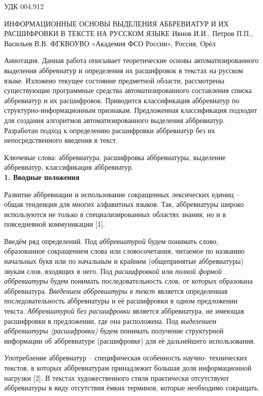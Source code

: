 \documentclass{article}
\begin{document}
УДК 004.912
\begin{center}
ИНФОРМАЦИОННЫЕ ОСНОВЫ ВЫДЕЛЕНИЯ АББРЕВИАТУР И
ИХ РАСШИФРОВКИ В ТЕКСТЕ НА РУССКОМ ЯЗЫКЕ
Ивнов И.И., Петров П.П., Васильев В.В.
ФГКВОУВО «Академия ФСО России»,
Россия, Орёл
\end{center}

Аннотация. Данная работа описывает теоретические основы
автоматизированного выделения аббревиатур и определения их
расшифровок в текстах на русском языке. Изложено текущее
состояние предметной области, рассмотрены существующие
программные средства автоматизированного составления списка
аббревиатур и их расшифровок. Приводится классификация
аббревиатур по структурно-информационным признакам.
Предложенная классификация подходит для создания алгоритмов
автоматизированного выделения аббревиатур. Разработан подход к
определению расшифровки аббревиатур без их непосредственного
введения в текст.

Ключевые слова: аббревиатура, расшифровка аббревиатуры,
выделение аббревиатур, классификация аббревиатур.
\\

\textbf{1. Вводные положения}

Развитие аббревиации и использование сокращенных
лексических единиц – общая тенденция для многих алфавитных
языков. Так, аббревиатуры широко используются не только в
специализированных областях знания, но и в повседневной
коммуникации [1].

Введём ряд определений. Под \textit{аббревиатурой} будем
понимать слово, образованное сокращением слова или
словосочетания, читаемое по названию начальных букв или по
начальным и крайним (общепринятые аббревиатуры) звукам слов,
входящих в него. Под \textit{расшифровкой} или \textit{полной формой
аббревиатуры} будем понимать последовательность слов, от которых
образована аббревиатура. \textit{Введением аббревиатуры в текст} является
определенная последовательность аббревиатуры и её расшифровки в
одном предложении текста. \textit{Аббревиатурой без расшифровки}
является аббревиатура, не имеющая расшифровки в предложении, где
она расположена. Под \textit{выделением аббревиатуры (расшифровки)}
будем понимать получение структурной информации об
аббревиатуре (расшифровке) для её дальнейшего использования.

Употребление аббревиатур – специфическая особенность
научно-
технических текстов, в которых аббревиатурам принадлежит
большая доля информационной нагрузки [2]. В текстах
художественного стиля практически отсутствуют аббревиатуры в
виду отсутствия ёмких терминов, которые необходимо сокращать.
\end{document}
